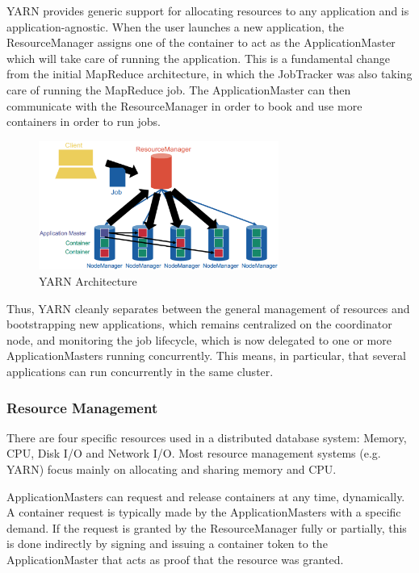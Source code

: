 YARN provides generic support for allocating resources to any application and is application-agnostic. When the user launches a new application, the ResourceManager assigns one of the container to act as the ApplicationMaster which will take care of running the application. This is a fundamental change from the initial MapReduce architecture, in which the JobTracker was also taking care of running the MapReduce job. The ApplicationMaster can then communicate with the ResourceManager in order to book and use more containers in order to run jobs.

\begin{figure}[h]
    \centering
    \includegraphics[width=0.7\textwidth]{Figures/YARNArchitecture.png}
    \caption{YARN Architecture}\label{fig:YARNArch}
\end{figure}

Thus, YARN cleanly separates between the general management of resources and bootstrapping new applications, which remains centralized on the coordinator node, and monitoring the job lifecycle, which is now delegated to one or more ApplicationMasters running concurrently. This means, in particular, that several applications can run concurrently in the same cluster.

\subsubsection{Resource Management}
There are four specific resources used in a distributed database system: Memory, CPU, Disk I/O and Network I/O. Most resource management systems (e.g. YARN) focus mainly on allocating and sharing memory and CPU.

ApplicationMasters can request and release containers at any time, dynamically. A container request is typically made by the ApplicationMasters with a specific demand. If the request is granted by the ResourceManager fully or partially, this is done indirectly by signing and issuing a container token to the ApplicationMaster that acts as proof that the resource was granted.

